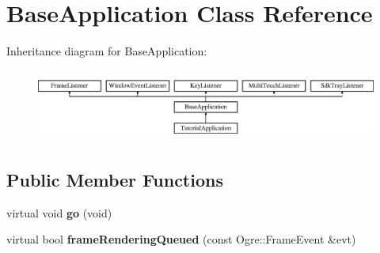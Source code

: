 \hypertarget{classBaseApplication}{\section{Base\-Application Class Reference}
\label{classBaseApplication}
}
Inheritance diagram for Base\-Application\-:\begin{figure}[H]
\begin{center}
\leavevmode
\includegraphics[height=2.382979cm]{classBaseApplication}
\end{center}
\end{figure}
\subsection*{Public Member Functions}
\begin{DoxyCompactItemize}
\item 
\hypertarget{classBaseApplication_a8a14a65a29118dd75173aa68678a05e1}{virtual void {\bfseries go} (void)}\label{classBaseApplication_a8a14a65a29118dd75173aa68678a05e1}

\item 
\hypertarget{classBaseApplication_a03912a0f38b38fede7f08a2571e8fc56}{virtual bool {\bfseries frame\-Rendering\-Queued} (const Ogre\-::\-Frame\-Event \&evt)}\label{classBaseApplication_a03912a0f38b38fede7f08a2571e8fc56}

\end{DoxyCompactItemize}
